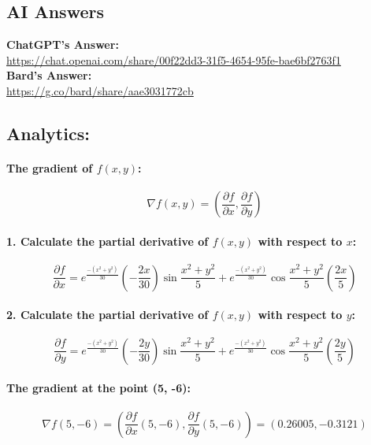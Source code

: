 \documentclass[11pt]{article} %
\begin{document}
\subsection{AI Answers}
\begin{mdframed}[
        backgroundcolor=white,  %
        linecolor=black,        %
        leftmargin=5pt,         %
        rightmargin=5pt,        %
        linewidth=2pt           %
    ]
    \textbf{ChatGPT's Answer: } \\
    \href{https://chat.openai.com/share/00f22dd3-31f5-4654-95fe-bae6bf2763f1}{https://chat.openai.com/share/00f22dd3-31f5-4654-95fe-bae6bf2763f1} \\
    \textbf{Bard's Answer: } \\
    \href{https://g.co/bard/share/aae3031772cb}{https://g.co/bard/share/aae3031772cb}
\end{mdframed}
% 
% 
% 
% 
% 
% 
% 
% 
% 
\subsection{Analytics:}
% 
% 
% 
\paragraph{The gradient of \(f(x, y)\):}
% 
$$
    \nabla f(x, y) = \left(\frac{\partial f}{\partial x}, \frac{\partial f}{\partial y}\right)
$$
% 
\paragraph{1. Calculate the partial derivative of \(f(x, y)\) with respect to \(x\):}
% 
$$ \frac{\partial f}{\partial x} = e^{\frac{-(x^2+y^2)}{30}}\left(-\frac{2x}{30}\right) \sin \frac{x^2+y^2}{5} + e^{\frac{-(x^2+y^2)}{30}} \cos \frac{x^2+y^2}{5} \left(\frac{2x}{5}\right) $$
% 
\paragraph{2. Calculate the partial derivative of \(f(x, y)\) with respect to \(y\):}
$$
    \frac{\partial f}{\partial y} = e^{\frac{-(x^2+y^2)}{30}}\left(-\frac{2y}{30}\right) \sin \frac{x^2+y^2}{5} + e^{\frac{-(x^2+y^2)}{30}} \cos \frac{x^2+y^2}{5} \left(\frac{2y}{5}\right)
$$
% 
\paragraph{The gradient at the point (5, -6):}
% 
$$
    \nabla f(5, -6) = \left(\frac{\partial f}{\partial x}(5, -6), \frac{\partial f}{\partial y}(5, -6)\right)=(0.26005, -0.3121)
$$
% 
\end{document}
